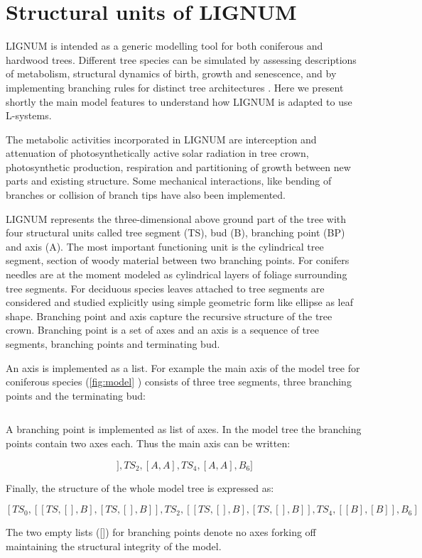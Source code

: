 \section{Structural units of LIGNUM}
LIGNUM is intended as a generic modelling tool for both coniferous and
hardwood trees.  Different tree  species can be simulated by assessing
descriptions of  metabolism, structural dynamics of  birth, growth and
senescence,  and by  implementing  branching rules  for distinct  tree
architectures  \citep{perttunen:96,  perttunen:01}.   Here we  present
shortly the main model features to understand how LIGNUM is adapted to
use L-systems.

The metabolic  activities incorporated in LIGNUM  are interception and
attenuation  of  photosynthetically  active  solar radiation  in  tree
crown,  photosynthetic  production,  respiration and  partitioning  of
growth  between  new parts  and  existing  structure. Some  mechanical
interactions,  like bending of  branches or  collision of  branch tips
have also been implemented.

LIGNUM represents the three-dimensional  above ground part of the tree
with  four  structural  units  called  tree  segment  (TS),  bud  (B),
branching point (BP) and axis (A). The most important functioning unit
is the cylindrical tree segment, section of woody material between two
branching points.  For  conifers needles are at the  moment modeled as
cylindrical  layers   of  foliage  surrounding   tree  segments.   For
deciduous species leaves attached  to tree segments are considered and
studied explicitly  using simple geometric  form like ellipse  as leaf
shape.  Branching  point and axis  capture the recursive  structure of
the tree  crown.  Branching point is  a set of  axes and an axis  is a
sequence of tree segments, branching points and terminating bud.

An axis  is implemented as  a list. For  example the main axis  of the
model tree for coniferous species (\ref{fig:model} ) consists of three
tree segments, three branching points and the terminating bud:

\begin{equation}
[TS_0,BP_1,TS_2,BP_3,TS_4,BP_5,B_6]
\end{equation}

A branching  point is implemented as  list of axes. In  the model tree
the branching points contain two axes  each. Thus the main axis can be
written:

\begin{equation}
[TS_0,[[A,A]],TS_2,[A,A],TS_4,[A,A],B_6]
\end{equation}

Finally, the structure of the whole model tree is expressed as:

\begin{equation}\label{eq:tree}
[TS_0,[[TS,[],B],[TS,[],B]],TS_2,[[TS,[],B],[TS,[],B]],TS_4,[[B],[B]],B_6]
\end{equation}

The two empty  lists ([]) for branching points  denote no axes forking
off maintaining the structural integrity of the model.

